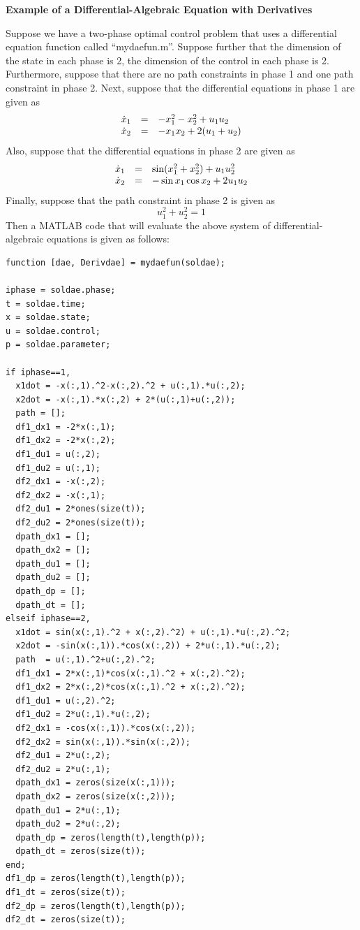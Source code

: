\documentclass[10pt,final]{report}
\newenvironment{shadedframe}{%
  \def\FrameCommand{\fcolorbox{black}{shadecolor}}%
  \MakeFramed {\FrameRestore}}
{\endMakeFramed}
\begin{document}
\begin{shadedframe}
  {\noindent}{\bf Example of a Differential-Algebraic Equation with Derivatives}
\vspace{12pt}

Suppose we have a two-phase optimal control problem that uses a differential
equation function called ``mydaefun.m''.  Suppose further that the dimension
of the state in each phase is 2, the dimension of the control in each
phase is 2.  Furthermore, suppose that there are no path constraints
in phase 1 and one path constraint in phase 2.  Next, suppose that
the differential equations in phase 1 are given as
\begin{displaymath}
  \begin{array}{lcl}
    \dot{x}_1 & = & -x_1^2-x_2^2 + u_1 u_2 \\
    \dot{x}_2 & = & -x_1x_2 + 2(u_1+u_2)
  \end{array}
\end{displaymath}
Also, suppose that the differential equations in phase 2 are given as
\begin{displaymath}
  \begin{array}{lcl}
    \dot{x}_1 & = & \sin(x_1^2+x_2^2) + u_1 u_2^2 \\
    \dot{x}_2 & = & -\sin x_1 \cos x_2 + 2u_1u_2
  \end{array}
\end{displaymath}
Finally, suppose that the path constraint in phase 2 is given as
\begin{displaymath}
  u_1^2+u_2^2 = 1
\end{displaymath}
Then a MATLAB code that will evaluate the above system of
differential-algebraic equations is given as follows:
\begin{verbatim}
function [dae, Derivdae] = mydaefun(soldae);

iphase = soldae.phase;
t = soldae.time;
x = soldae.state;
u = soldae.control;
p = soldae.parameter;

if iphase==1,
  x1dot = -x(:,1).^2-x(:,2).^2 + u(:,1).*u(:,2);
  x2dot = -x(:,1).*x(:,2) + 2*(u(:,1)+u(:,2));
  path = [];
  df1_dx1 = -2*x(:,1);
  df1_dx2 = -2*x(:,2);
  df1_du1 = u(:,2);
  df1_du2 = u(:,1);
  df2_dx1 = -x(:,2);
  df2_dx2 = -x(:,1);
  df2_du1 = 2*ones(size(t));
  df2_du2 = 2*ones(size(t));
  dpath_dx1 = [];
  dpath_dx2 = [];
  dpath_du1 = [];
  dpath_du2 = [];
  dpath_dp = [];
  dpath_dt = [];
elseif iphase==2,
  x1dot = sin(x(:,1).^2 + x(:,2).^2) + u(:,1).*u(:,2).^2;
  x2dot = -sin(x(:,1)).*cos(x(:,2)) + 2*u(:,1).*u(:,2);
  path  = u(:,1).^2+u(:,2).^2;
  df1_dx1 = 2*x(:,1)*cos(x(:,1).^2 + x(:,2).^2);
  df1_dx2 = 2*x(:,2)*cos(x(:,1).^2 + x(:,2).^2);
  df1_du1 = u(:,2).^2;
  df1_du2 = 2*u(:,1).*u(:,2);
  df2_dx1 = -cos(x(:,1)).*cos(x(:,2));
  df2_dx2 = sin(x(:,1)).*sin(x(:,2));
  df2_du1 = 2*u(:,2);
  df2_du2 = 2*u(:,1);
  dpath_dx1 = zeros(size(x(:,1)));
  dpath_dx2 = zeros(size(x(:,2)));
  dpath_du1 = 2*u(:,1);
  dpath_du2 = 2*u(:,2);
  dpath_dp = zeros(length(t),length(p));
  dpath_dt = zeros(size(t));
end;
df1_dp = zeros(length(t),length(p));
df1_dt = zeros(size(t));
df2_dp = zeros(length(t),length(p));
df2_dt = zeros(size(t));


\end{verbatim}
\end{shadedframe}
\end{document}
